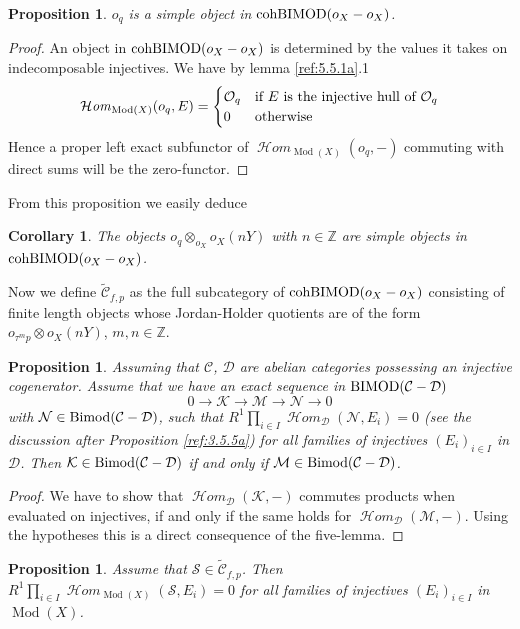\documentclass{amsproc}
\def \ZZ{{\mathbb Z}}
\def\Cscr{{\mathcal C}}
\def\Dscr{{\mathcal D}}
\def\Hscr{{\mathcal H}}
\def\Kscr{{\mathcal K}}
\def\Mscr{{\mathcal M}}
\def\Nscr{{\mathcal N}}
\def\Oscr{{\mathcal O}}
\def\Sscr{{\mathcal S}}
\def\HHom{\operatorname {\Hscr \mathit{om}}}
\def\Bimod{\mathop{\text{Bimod}}}
\def\BIMOD{\mathop{\text{BIMOD}}}
\def\cohBIMOD{\mathop{\text{cohBIMOD}}}
\def\HHom{\operatorname {\Hscr \mathit{om}}}
\def\Qch{\operatorname {Mod}}
\def\r{\rightarrow}
\let\oldtext\text
\def\text#1{\oldtext{\upshape #1}}
\newtheorem{propositions}[lemmas]{Proposition}
\newtheorem{corollarys}[lemmas]{Corollary}
\theoremstyle{definition}
\theoremstyle{remark}
\numberwithin{equation}{section}
\numberwithin{table}{section}
\numberwithin{figure}{section}
\begin{document}
\begin{propositions} $o_q$ is a simple object in 
$\cohBIMOD(o_X-o_X)$.
\end{propositions}
\begin{proof} An object in $\cohBIMOD(o_X-o_X)$ is determined by the
values it takes on indecomposable injectives.
We have by lemma \ref{ref:5.5.1a}.1
\[
\HHom_{\Qch(X)}(o_q,E)=\begin{cases} \Oscr_q&\text{if $E$ is the
    injective hull of $\Oscr_q$}\\ 0&\text{otherwise}
\end{cases}
\]
Hence a proper left exact subfunctor of $\HHom_{\Qch(X)}(o_q,-)$
commuting with direct sums will be the zero-functor.
\end{proof}
From this proposition we easily deduce
\begin{corollarys} The objects $o_q\otimes_{o_X} o_X(nY)$ with $n\in\ZZ$ are
simple objects in $\cohBIMOD(o_X-o_X)$.
\end{corollarys}
Now we define $\tilde{\Cscr}_{f,p}$ as the full subcategory of
$\cohBIMOD(o_X-o_X)$ consisting of finite length objects whose
Jordan-Holder quotients are of the form $o_{\tau ^m p}\otimes o_X(nY)$, $m,n\in \ZZ$. 
\begin{propositions} 
\label{ref:5.5.4a}
Assuming that $\Cscr$, $\Dscr$ are abelian
categories possessing an injective cogenerator. Assume that we have an
exact sequence in $\BIMOD(\Cscr-\Dscr)$
\[
0\r \Kscr\r \Mscr\r \Nscr\r 0
\]
with $\Nscr\in\Bimod(\Cscr-\Dscr)$, such that $R^1\prod_{i\in I}
\HHom_\Dscr(\Nscr,E_i)=0$ (see the discussion after Proposition
\ref{ref:3.5.5a}) for all families of injectives $(E_i)_{i\in I}$ in
$\Dscr$.  Then $\Kscr\in \Bimod(\Cscr-\Dscr)$ if and only if
$\Mscr\in\Bimod(\Cscr-\Dscr)$.
\end{propositions}
\begin{proof}
We have to show that $\HHom_\Dscr(\Kscr,-)$ commutes products when
evaluated on injectives, if and only if the same holds for
$\HHom_\Dscr(\Mscr,-)$. Using the hypotheses this is a
direct consequence of the five-lemma.
\end{proof}
\begin{propositions}
\label{ref:5.5.5a}
Assume that $\Sscr\in \tilde{\Cscr}_{f,p}$. Then 
$R^1\prod_{i\in I}
\HHom_{\Qch(X)}(\Sscr,E_i)=0$  for all families of 
injectives $(E_i)_{i\in I}$ in $\Qch(X)$.
\end{propositions}
\end{document}
